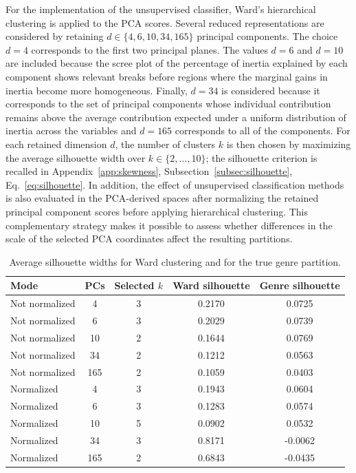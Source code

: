 For the implementation of the unsupervised classifier, Ward's hierarchical clustering is applied to the PCA scores. Several reduced representations are considered by retaining \(d \in \{4,6,10,34,165\}\) principal components. The choice \(d=4\) corresponds to the first two principal planes. The values \(d=6\) and \(d=10\) are included because the scree plot of the percentage of inertia explained by each component shows relevant breaks before regions where the marginal gains in inertia become more homogeneous. Finally, \(d=34\) is considered because it corresponds to the set of principal components whose individual contribution remains above the average contribution expected under a uniform distribution of inertia across the variables and \(d=165\) corresponds to all of the components.
For each retained dimension \(d\), the number of clusters \(k\) is then chosen by maximizing the average silhouette width over \(k \in \{2,\dots,10\}\); the silhouette criterion is recalled in Appendix~\ref{app:skewness}, Subsection~\ref{subsec:silhouette}, Eq.~\eqref{eq:silhouette}. In addition, the effect of unsupervised classification methods is also evaluated in the PCA-derived spaces after normalizing the retained principal component scores before applying hierarchical clustering. This complementary strategy makes it possible to assess whether differences in the scale of the selected PCA coordinates affect the resulting partitions.

\begin{table}[!t]
\centering
\caption{Average silhouette widths for Ward clustering and for the true genre partition.}
\label{tab:ward_genre_silhouettes}
\scriptsize

\begin{tabular}{lcccc}
\toprule
Mode & PCs & Selected \(k\) & Ward silhouette & Genre silhouette \\
\midrule
Not normalized & 4  & 3 & 0.2170 & 0.0725 \\
Not normalized & 6  & 3 & 0.2029 & 0.0739 \\
Not normalized & 10 & 2 & 0.1644 & 0.0769 \\
Not normalized & 34 & 2 & 0.1212 & 0.0563 \\
Not normalized & 165 & 2 & 0.1059 & 0.0403 \\
Normalized     & 4  & 3 & 0.1943 & 0.0604 \\
Normalized     & 6  & 3 & 0.1283 & 0.0574 \\
Normalized     & 10 & 5 & 0.0902 & 0.0532 \\
Normalized     & 34 & 3 & 0.8171 & -0.0062 \\
Normalized     & 165 & 2 & 0.6843 & -0.0435 \\
\bottomrule
\end{tabular}
\end{table}

